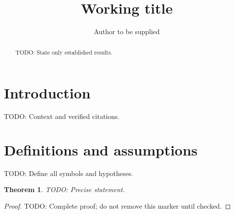 \documentclass{article}
\title{Working title}
\author{Author to be supplied}
\newtheorem{theorem}{Theorem}
\begin{document}
\maketitle
\begin{abstract}TODO: State only established results.\end{abstract}
\section{Introduction}
TODO: Context and verified citations.
\section{Definitions and assumptions}
TODO: Define all symbols and hypotheses.
\begin{theorem}
TODO: Precise statement.
\end{theorem}
\begin{proof}
TODO: Complete proof; do not remove this marker until checked.
\end{proof}
\end{document}
